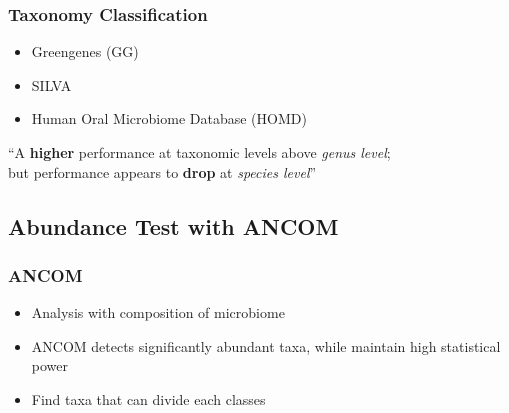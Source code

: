 \documentclass{beamer}
\begin{document}
    \begin{frame}
        \frametitle{Taxonomy Classification}

        \begin{itemize}
            \item Greengenes (GG) \cite{greengenes1}
            \item SILVA \cite{silva1, silva2}
            \item Human Oral Microbiome Database (HOMD) \cite{homd1}
        \end{itemize}

        “A \textbf{higher} performance at taxonomic levels above \textit{genus level}; \\
        but performance appears to \textbf{drop} at \textit{species level}” \cite{performance1}
    \end{frame}

    \subsection{Abundance Test with ANCOM}
    \begin{frame}
        \frametitle{ANCOM}

        \begin{itemize}
            \item Analysis with composition of microbiome \cite{ANCOM1}
            \item ANCOM detects significantly abundant taxa, while maintain high statistical power
            \item Find taxa that can divide each classes
        \end{itemize}
    \end{frame}
\end{document}
